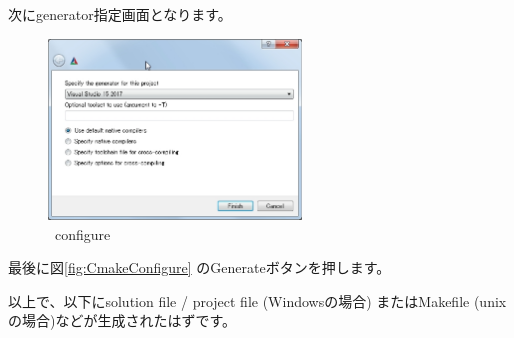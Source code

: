 次にgenerator指定画面となります。
\begin{narrow}[15pt]
	\begin{figure}[h]
	\begin{center}
	\includegraphics[width=0.6\textwidth]{fig/CmakeConfigure3.eps}
	\end{center}
	\caption{\cmake\ configure}
	\label{fig:CmakeGeneration}
	\end{figure}
\end{narrow}

最後に図\ref{fig:CmakeConfigure} のGenerateボタンを押します。

\medskip
以上で、\DQuote{\BldDir}以下にsolution file / project file (Windowsの場合)
またはMakefile (unixの場合)などが生成されたはずです。

